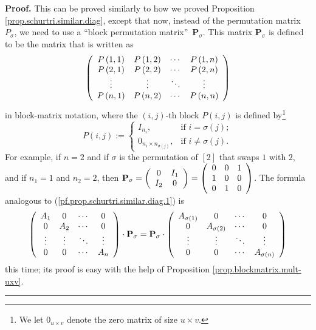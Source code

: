 \documentclass[numbers=enddot,12pt,final,onecolumn,notitlepage]{scrartcl}%
\numberwithin{exer}{subsection}
\theoremstyle{definition}
\newenvironment{proof}[1][Proof]{\noindent\textbf{#1.} }{\ \rule{0.5em}{0.5em}}
\begin{document}
\begin{proof}
This can be proved similarly to how we proved Proposition
\ref{prop.schurtri.similar.diag}, except that now, instead of the permutation
matrix $P_{\sigma}$, we need to use a \textquotedblleft block permutation
matrix\textquotedblright\ $\mathbf{P}_{\sigma}$. This matrix $\mathbf{P}%
_{\sigma}$ is defined to be the matrix that is written as%
\[
\left(
\begin{array}
[c]{cccc}%
P\left(  1,1\right)  & P\left(  1,2\right)  & \cdots & P\left(  1,n\right) \\
P\left(  2,1\right)  & P\left(  2,2\right)  & \cdots & P\left(  2,n\right) \\
\vdots & \vdots & \ddots & \vdots\\
P\left(  n,1\right)  & P\left(  n,2\right)  & \cdots & P\left(  n,n\right)
\end{array}
\right)
\]
in block-matrix notation, where the $\left(  i,j\right)  $-th block $P\left(
i,j\right)  $ is defined by\footnote{We let $0_{u\times v}$ denote the zero
matrix of size $u\times v$.}%
\[
P\left(  i,j\right)  :=%
\begin{cases}
I_{n_{i}}, & \text{if }i=\sigma\left(  j\right)  ;\\
0_{n_{i}\times n_{\sigma\left(  j\right)  }}, & \text{if }i\neq\sigma\left(
j\right)  .
\end{cases}
\]
For example, if $n=2$ and if $\sigma$ is the permutation of $\left[  2\right]
$ that swaps $1$ with $2$, and if $n_{1}=1$ and $n_{2}=2$, then $\mathbf{P}%
_{\sigma}=\left(
\begin{array}
[c]{cc}%
0 & I_{1}\\
I_{2} & 0
\end{array}
\right)  =\left(
\begin{array}
[c]{ccc}%
0 & 0 & 1\\
1 & 0 & 0\\
0 & 1 & 0
\end{array}
\right)  $. The formula analogous to (\ref{pf.prop.schurtri.similar.diag.1})
is%
\[
\left(
\begin{array}
[c]{cccc}%
A_{1} & 0 & \cdots & 0\\
0 & A_{2} & \cdots & 0\\
\vdots & \vdots & \ddots & \vdots\\
0 & 0 & \cdots & A_{n}%
\end{array}
\right)  \cdot\mathbf{P}_{\sigma}=\mathbf{P}_{\sigma}\cdot\left(
\begin{array}
[c]{cccc}%
A_{\sigma\left(  1\right)  } & 0 & \cdots & 0\\
0 & A_{\sigma\left(  2\right)  } & \cdots & 0\\
\vdots & \vdots & \ddots & \vdots\\
0 & 0 & \cdots & A_{\sigma\left(  n\right)  }%
\end{array}
\right)
\]
this time; its proof is easy with the help of Proposition
\ref{prop.blockmatrix.mult-uxv}.
\end{proof}
\end{document}
